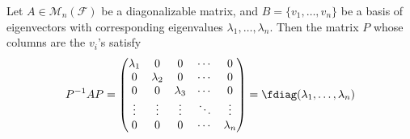 \begin{thm}\label{thm-change-of-base-matrix-eigenvalues}
	Let $A\in\mathcal{M}_n(\mathcal{F})$ be a diagonalizable matrix, and
	$B=\{v_1,\dots,v_n\}$ be a basis of eigenvectors with corresponding
	eigenvalues $\lambda_1,\dots,\lambda_n$. Then the matrix $P$ whose columns
	are the $v_i$'s satisfy
	\begin{equation*}
		P^{-1}AP=\begin{pmatrix}
			\lambda_1 & 0         & 0         & \cdots & 0         \\
			0         & \lambda_2 & 0         & \cdots & 0         \\
			0         & 0         & \lambda_3 & \cdots & 0         \\
			\vdots    & \vdots    & \vdots    & \ddots & \vdots    \\
			0         & 0         & 0         & \cdots & \lambda_n
		\end{pmatrix}=\fdiag(\lambda_1,\dots,\lambda_n)
	\end{equation*}
\end{thm}

